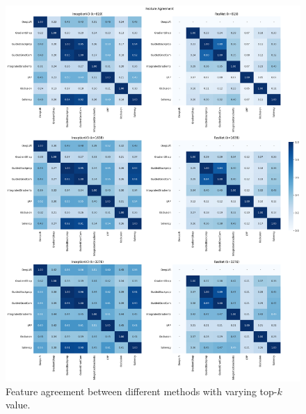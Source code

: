 \begin{figure}[p]
    \centering
    \includegraphics[width=\textwidth]{images/results/pneumothorax/fa.png}
    \caption{Feature agreement between different methods with varying top-$k$ value.}
    \label{fig:featureAgreement}
\end{figure}

